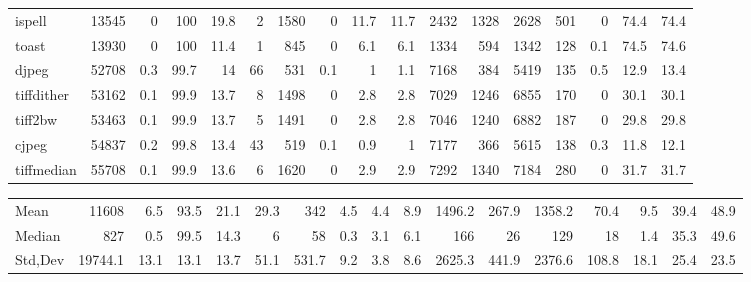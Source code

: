 \begin{tabular}{lrrrrrrrrrrrrrrrr}
 ispell          &          13545 &    0   &       100   &   19.8 &     2 &    1580 &    0   &     11.7 &          11.7 & 2432 &      1328 &     2628 &  501 &    0   &     74.4 &          74.4 \\
 toast           &          13930 &    0   &       100   &   11.4 &     1 &     845 &    0   &      6.1 &           6.1 & 1334 &       594 &     1342 &  128 &    0.1 &     74.5 &          74.6 \\
 djpeg           &          52708 &    0.3 &        99.7 &   14   &    66 &     531 &    0.1 &      1   &           1.1 & 7168 &       384 &     5419 &  135 &    0.5 &     12.9 &          13.4 \\
 tiffdither      &          53162 &    0.1 &        99.9 &   13.7 &     8 &    1498 &    0   &      2.8 &           2.8 & 7029 &      1246 &     6855 &  170 &    0   &     30.1 &          30.1 \\
 tiff2bw         &          53463 &    0.1 &        99.9 &   13.7 &     5 &    1491 &    0   &      2.8 &           2.8 & 7046 &      1240 &     6882 &  187 &    0   &     29.8 &          29.8 \\
 cjpeg           &          54837 &    0.2 &        99.8 &   13.4 &    43 &     519 &    0.1 &      0.9 &           1   & 7177 &       366 &     5615 &  138 &    0.3 &     11.8 &          12.1 \\
 tiffmedian      &          55708 &    0.1 &        99.9 &   13.6 &     6 &    1620 &    0   &      2.9 &           2.9 & 7292 &      1340 &     7184 &  280 &    0   &     31.7 &          31.7 \\
\hline
\end{tabular}\begin{tabular}{lrrrrrrrrrrrrrrrr}
\hline
 Mean    & 11608   &  6.5 & 93.5 & 21.1 & 29.3 & 342   & 4.5 & 4.4 & 8.9 & 1496.2 & 267.9 & 1358.2 &  70.4 &  9.5 & 39.4 & 48.9 \\
 Median  &   827   &  0.5 & 99.5 & 14.3 &  6   &  58   & 0.3 & 3.1 & 6.1 &  166   &  26   &  129   &  18   &  1.4 & 35.3 & 49.6 \\
 Std,Dev & 19744.1 & 13.1 & 13.1 & 13.7 & 51.1 & 531.7 & 9.2 & 3.8 & 8.6 & 2625.3 & 441.9 & 2376.6 & 108.8 & 18.1 & 25.4 & 23.5 \\
\hline
\end{tabular}
